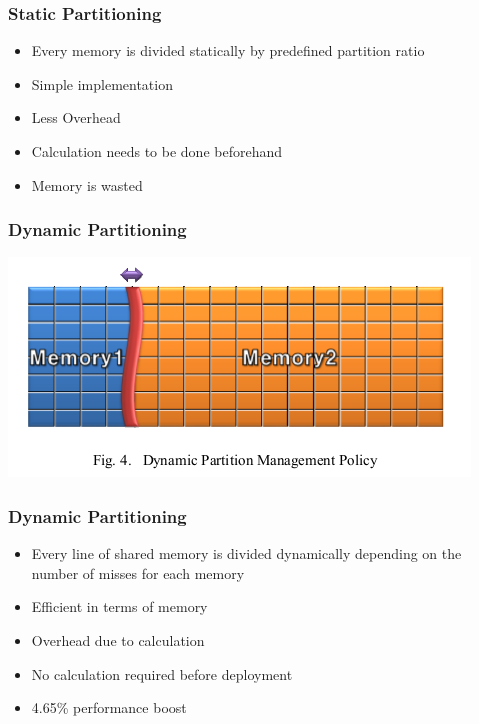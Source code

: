 \documentclass{beamer}
\begin{document}
\begin{frame}
\frametitle{Static Partitioning}
\begin{itemize}
\item Every memory is divided statically by predefined partition ratio
\item Simple implementation
\item Less Overhead
\item Calculation needs to be done beforehand
\item Memory is wasted


\end{itemize}

\end{frame}


\begin{frame}

\frametitle{Dynamic Partitioning}
\begin{center}
\includegraphics[width=\textwidth]{dynamic}
\end{center}

\end{frame}




\begin{frame}
\frametitle{Dynamic Partitioning}
\begin{itemize}
\item Every line of shared memory is divided dynamically depending on the number of misses for each memory
\item Efficient in terms of memory
\item Overhead due to calculation
\item No calculation required before deployment
\item 4.65\% performance boost 
 

\end{itemize}

\end{frame}
\end{document}
